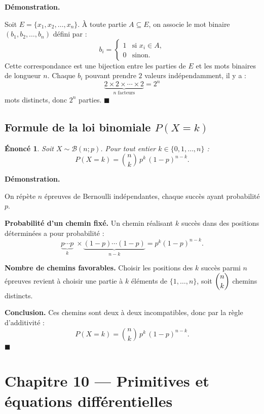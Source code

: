 \documentclass[11pt,a4paper]{article}
\theoremstyle{enoncestyle}
\newtheorem{enonce}{Énoncé}[section]
\renewenvironment{proof}[1][\proofname]{%
  \par\medskip
  \noindent\textbf{\color{black!70}#1.}\quad\itshape
}{%
  \hfill$\blacksquare$\par\medskip
}
\begin{document}
\begin{proof}[Démonstration]
Soit $E = \{x_1, x_2, \ldots, x_n\}$. À toute partie $A \subseteq E$, on associe le mot
binaire $(b_1, b_2, \ldots, b_n)$ défini par :
\[
    b_i = \begin{cases} 1 & \text{si } x_i \in A, \\ 0 & \text{sinon.}\end{cases}
\]
Cette correspondance est une bijection entre les parties de $E$ et les mots binaires de
longueur $n$. Chaque $b_i$ pouvant prendre $2$ valeurs indépendamment, il y a :
\[
    \underbrace{2 \times 2 \times \cdots \times 2}_{n \text{ facteurs}} = 2^n
\]
mots distincts, donc $2^n$ parties.
\end{proof}

\subsection{Formule de la loi binomiale $P(X=k)$}

\begin{mdframed}[linecolor=blue!40,backgroundcolor=blue!4,linewidth=1pt]
\begin{enonce}
Soit $X \sim \mathcal{B}(n;p)$. Pour tout entier $k \in \{0, 1, \ldots, n\}$ :
\[
    P(X = k) = \binom{n}{k}\,p^k\,(1-p)^{n-k}.
\]
\end{enonce}
\end{mdframed}

\begin{proof}[Démonstration]
On répète $n$ épreuves de Bernoulli indépendantes, chaque succès ayant probabilité $p$.

\textbf{Probabilité d'un chemin fixé.}
Un chemin réalisant $k$ succès dans des positions déterminées a pour probabilité :
\[
    \underbrace{p \cdots p}_{k}\; \times \underbrace{(1-p)\cdots(1-p)}_{n-k}
    = p^k(1-p)^{n-k}.
\]

\textbf{Nombre de chemins favorables.}
Choisir les positions des $k$ succès parmi $n$ épreuves revient à choisir une partie à $k$
éléments de $\{1, \ldots, n\}$, soit $\dbinom{n}{k}$ chemins distincts.

\textbf{Conclusion.}
Ces chemins sont deux à deux incompatibles, donc par la règle d'additivité :
\[
    P(X = k) = \binom{n}{k}\,p^k\,(1-p)^{n-k}.
\]
\end{proof}

\section{Chapitre 10 — Primitives et équations différentielles}
\end{document}
